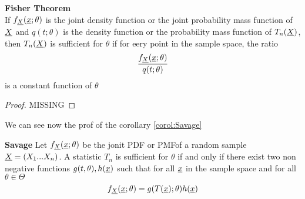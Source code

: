 \begin{teo}\textbf{Fisher Theorem}\\
	If $f_{\underline X}(\underline{x};\theta)$ is the joint density function or the joint probability mass function of $\underline X$ and $q(t;\theta)$ is the density function or the probability mass function of $T_n(\underline X)$, then $T_n(\underline X)$ is sufficient for $\theta$ if for eery point in the sample space, the ratio
	$$\frac{f_{\underline X}(\underline{x};\theta)}{q(t;\theta)}$$ 
	is a constant function of $\theta$
\end{teo}
\begin{proof}
	MISSING
\end{proof}
We can see now the prof of the corollary \ref{corol:Savage}
\begin{corol}\textbf{Savage}
	Let $f_{\underline X}(\underline{x};\theta)$ be the jonit PDF or PMFof a random sample $\underline X=(X_1... X_n)$. A statistic $T_n$ is sufficient for $\theta$ if and only if there exist two non negative functions $g(t,\theta), h(\underline x)$ such that for all $\underline x$ in the sample space and for all $\theta\in \Theta$ 
	$$f_{\underline X}(\underline{x};\theta)=g(T(\underline x);\theta)h(\underline x)$$
\end{corol}
